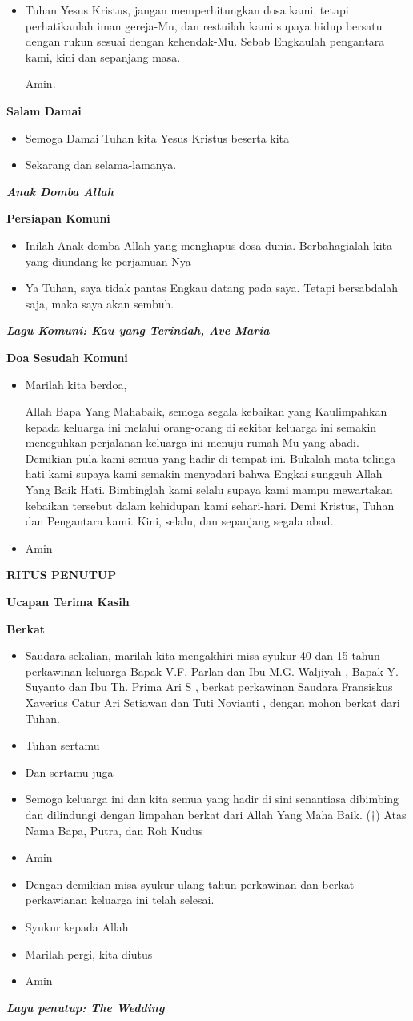 \documentclass[10pt]{book}
\makeatletter
\newcommand{\judul}[1]{%
  {\parindent \z@ \centering \normalfont
    \interlinepenalty\@M \Large \bfseries #1\par\nobreak \vskip 20\p@ }}
\newcommand{\subjudul}[1]{%
  {\parindent \z@ \normalfont
    \interlinepenalty\@M \bfseries #1\par\nobreak \vskip 20\p@ }}
\newcommand{\lagu}[1]{%
  {\parindent \z@ \normalfont
    \interlinepenalty\@M \bfseries \emph{#1}\par\nobreak \vskip 20\p@ }}
\newcommand{\BU}[1]{\begin{itemize} \item[U:] #1 \end{itemize}}
\newcommand{\BI}[1]{\begin{itemize} \item[I:] #1 \end{itemize}}
\newcommand{\ultah}{40 }
\newcommand{\suami}{V.F. Parlan }
\newcommand{\istri}{M.G. Waljiyah }
\newcommand{\ultahdua}{15 }
\newcommand{\suamidua}{Y. Suyanto }
\newcommand{\istridua}{Th. Prima Ari S }
\newcommand{\mempelaip}{Fransiskus Xaverius Catur Ari Setiawan }
\newcommand{\mempelaiw}{Tuti Novianti }
\makeatother
\begin{document}
\BU{Tuhan Yesus Kristus, jangan memperhitungkan dosa kami, tetapi perhatikanlah iman gereja-Mu, dan restuilah kami supaya hidup bersatu dengan rukun sesuai dengan kehendak-Mu. Sebab Engkaulah pengantara kami, kini dan sepanjang masa.

Amin.}

\subjudul{Salam Damai}

\BI{Semoga Damai Tuhan kita Yesus Kristus beserta kita}

\BU{Sekarang dan selama-lamanya.}

\lagu{Anak Domba Allah}

\subjudul{Persiapan Komuni}

\BI{Inilah Anak domba Allah yang menghapus dosa dunia. Berbahagialah kita yang diundang ke perjamuan-Nya}
\BU{Ya Tuhan, saya tidak pantas Engkau datang pada saya. Tetapi bersabdalah saja, maka saya akan sembuh.}

\lagu{Lagu Komuni: Kau yang Terindah, Ave Maria}

\subjudul{Doa Sesudah Komuni}

\BI{Marilah kita berdoa,

Allah Bapa Yang Mahabaik, semoga segala kebaikan yang Kaulimpahkan kepada keluarga ini melalui orang-orang di sekitar keluarga ini semakin meneguhkan perjalanan keluarga ini menuju rumah-Mu yang abadi. Demikian pula kami semua yang hadir di tempat ini. Bukalah mata telinga hati kami supaya kami semakin menyadari bahwa Engkai sungguh Allah Yang Baik Hati. Bimbinglah kami selalu supaya kami mampu mewartakan kebaikan tersebut dalam kehidupan kami sehari-hari. Demi Kristus, Tuhan dan Pengantara kami. Kini, selalu, dan sepanjang segala abad.}

\BU{Amin}

\judul{RITUS PENUTUP}

\subjudul{Ucapan Terima Kasih}

\subjudul{Berkat}

\BI{Saudara sekalian, marilah kita mengakhiri misa syukur \ultah dan \ultahdua tahun perkawinan keluarga Bapak \suami dan Ibu \istri, Bapak \suamidua dan Ibu \istridua, berkat perkawinan Saudara \mempelaip dan \mempelaiw, dengan mohon berkat dari Tuhan.}
\BI{Tuhan sertamu}
\BU{Dan sertamu juga}
\BI{Semoga keluarga ini dan kita semua yang hadir di sini senantiasa dibimbing dan dilindungi dengan limpahan berkat dari Allah Yang Maha Baik. ($\dagger$) Atas Nama Bapa, Putra, dan Roh Kudus}
\BU{Amin}
\BI{Dengan demikian misa syukur ulang tahun perkawinan dan berkat perkawianan keluarga ini telah selesai.}
\BU{Syukur kepada Allah.}
\BI{Marilah pergi, kita diutus}
\BU{Amin}

\lagu{Lagu penutup: The Wedding}
\end{document}

